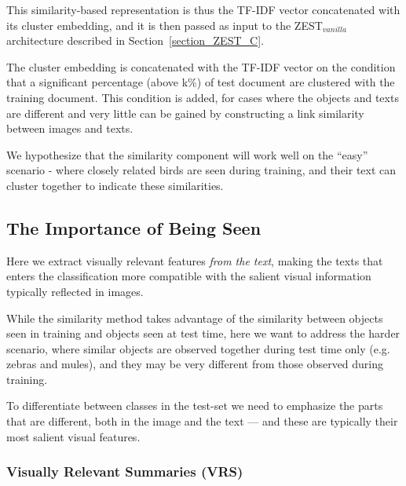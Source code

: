 \documentclass[11pt,a4paper]{article}
\newcommand\gal[1]{\textcolor{bright}{\textbf{GAL:} #1 }}
\begin{document}
This similarity-based representation is thus the TF-IDF vector concatenated with its cluster embedding, and it is then passed as input to the ZEST$_{vanilla}$ architecture described in Section~\ref{section_ZEST_C}.  \par

The cluster embedding is concatenated with the TF-IDF vector on the condition that a significant percentage (above k\%) of test document are clustered with the training document. This condition is added, for cases where the objects and texts are different and very little can be gained by constructing a link similarity between images and texts.
\par
We hypothesize that the similarity component will work well on the \enquote{easy} scenario - where closely related birds are seen during training,  and their text can cluster together to indicate these similarities.

\subsection{The Importance of Being Seen}

Here we extract visually relevant features \textit{from the text}, making the texts that enters the classification more compatible with the salient visual information typically reflected in images. 

While the similarity method takes advantage of the similarity between objects seen in training and objects seen at test time, here we want to address the harder scenario, where similar objects are observed together during test time only (e.g. zebras and mules), and they may be very different from those observed during training.  

To differentiate between  classes in the test-set we need to emphasize the parts that are  different, both in the image and the text --- and these are typically their most salient visual features. %

\subsubsection{Visually Relevant Summaries (VRS)}
\label{section:vrs_component}
\end{document}
